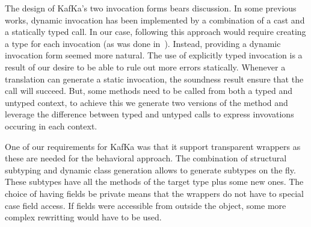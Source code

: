 \documentclass[a4paper,USenglish]{lipics-v2018}
\newcommand{\kafka}{{\sf KafKa}\xspace}
\newcounter{lem}
\begin{document}
The design of \kafka's two invocation forms bears discussion. In some
previous works, dynamic invocation has been implemented by a combination of
a cast and a statically typed call. In our case, following this approach
would require creating a type for each invocation (as was done
in~\cite{popl10}). Instead, providing a dynamic invocation form seemed more
natural. The use of explicitly typed invocation is a result of our desire
to be able to rule out more errors statically. Whenever a translation can
generate a static invocation, the soundness result ensure that the call will
succeed. But, some methods need to be called from both a typed and untyped
context, to achieve this we generate two versions of the method and leverage
the difference between typed and untyped calls to express invovations
occuring in each context.

One of our requirements for \kafka was that it support transparent wrappers
as these are needed for the behavioral approach. The combination of
structural subtyping and dynamic class generation allows to generate
subtypes on the fly. These subtypes have all the methods of the target type
plus some new ones. The choice of having fields be private means that the
wrappers do not have to special case field access. If fields were accessible
from outside the object, some more complex rewritting would have to be
used.
\end{document}
